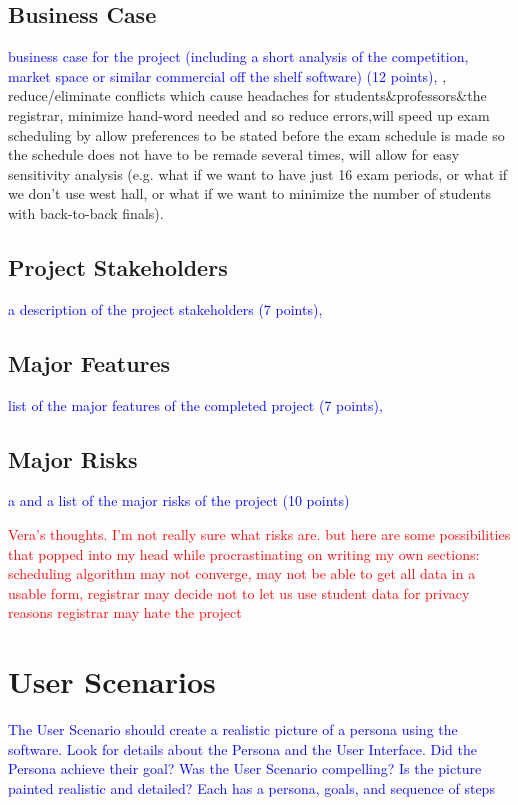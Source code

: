 \documentclass[11pt]{article}
\begin{document}
\subsection{Business Case} %
\textcolor{blue}{ business case for the project (including a short analysis of the
 competition, market space or similar commercial off the shelf software) (12 points),}
, reduce/eliminate conflicts which cause headaches for students\&professors\&the registrar, minimize hand-word needed and so reduce errors,will speed up exam scheduling by allow preferences to be stated before the exam schedule is made so the schedule does not have to be remade several times, will allow for easy sensitivity analysis (e.g. what if we want to have just 16 exam periods, or what if we don't use west hall, or what if we want to minimize the number of students with back-to-back finals).
\subsection{Project Stakeholders} %
\textcolor{blue}{a description of the project stakeholders (7 points),}
\subsection{Major Features} %
\textcolor{blue}{ list of the major features of the completed project (7 points),}
\subsection{Major Risks} %
\textcolor{blue}{a and a list of the major risks of the project (10 points)}

\textcolor{red}{Vera's thoughts. I'm not really sure what risks are. but here are some possibilities that popped into my head while procrastinating on writing my own sections:
scheduling algorithm may not converge,
may not be able to get all data in a usable form,
registrar may decide not to let us use student data for privacy reasons 
registrar may hate the project}


\section{User Scenarios}  %
\textcolor{blue}{The User Scenario should create a realistic picture of a persona using the software.  
Look for details about the Persona and the User Interface.  
Did the Persona achieve their goal?  
Was the User Scenario compelling?  
Is the picture painted realistic and detailed?
Each has a persona, goals, and sequence of steps}
\end{document}
